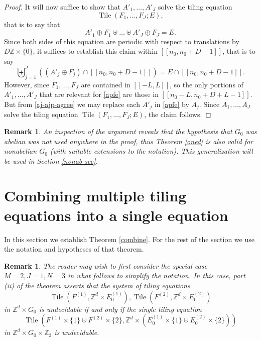 \documentclass[reqno,a4paper,12pt]{amsart}
\numberwithin{equation}{section}
\numberwithin{figure}{section}
\def\Z{\mathbb{Z}}
\newcommand{\Tile}{\operatorname{Tile}}
\theoremstyle{plain}
\newtheorem{remark}[thm]{Remark}
\theoremstyle{definition}
\begin{document}
\begin{proof}
It will now suffice to show that  $A'_1, \dots, A'_J$ solve the tiling equation 
$$\Tile(F_1,\dots,F_J; E),$$
that is to say that
$$ A'_1 \oplus F_1 \uplus \dots \uplus A'_J \oplus F_J = E.$$
Since both sides of this equation are periodic with respect to translations by $D\Z \times \{0\}$, it suffices to establish this claim within $[[n_0,n_0+D-1]]$, that is to say
\begin{equation}\label{apfe}
\biguplus_{j=1}^J \left((A'_j \oplus F_j) \cap [[n_0,n_0+D-1]]\right)
= E \cap [[n_0,n_0+D-1]].
\end{equation}
However, since $F_1,\dots,F_J$ are contained in $[[-L,L]]$, so the only portions of $A'_1,\dots,A'_J$ that are relevant for \eqref{apfe} are those in $[[n_0-L,n_0+D+L-1]]$.  But from \eqref{aj-ajp-agree} we may replace each $A'_j$ in \eqref{apfe} by $A_j$.  Since $A_1,\dots,A_J$ solve the tiling equation $\Tile(F_1,\dots,F_J; E)$, the claim follows.
\end{proof}

\begin{remark} An inspection of the argument reveals that the hypothesis that $G_0$ was abelian was not used anywhere in the proof, thus Theorem \ref{oned} is also valid for nonabelian $G_0$ (with suitable extensions to the notation).  This generalization will be used in Section \ref{nonab-sec}.
\end{remark}

\section{Combining multiple tiling equations into a single equation}\label{combine-sec}

In this section we establish Theorem \ref{combine}. For the rest of the section we use the notation and hypotheses of that theorem. 

\begin{remark} The reader may wish to first consider the special case $M=2, J=1, N=3$ in what follows to simplify the notation.  In this case, part (ii) of the theorem asserts that the system of tiling equations
$$ \Tile(F^{(1)}, \Z^d \times E_0^{(1)}),  \Tile(F^{(2)}, \Z^d \times E_0^{(2)})$$
in $\Z^d \times G_0$ is undecidable if and only if the single tiling equation
$$ \Tile( F^{(1)} \times \{1\} \uplus F^{(2)} \times \{2\}, \Z^d \times (E_0^{(1)} \times \{1\} \uplus E_0^{(2)} \times \{2\}))$$
in $\Z^d \times G_0 \times \Z_3$ is undecidable.
\end{remark}
\end{document}
